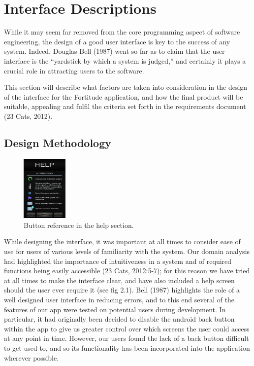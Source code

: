 \section{Interface Descriptions}
While it may seem far removed from the core programming aspect of software engineering, the design of a good user interface is key to the success of any system. Indeed, Douglas Bell (1987) went so far as to claim that the user interface is the “yardstick by which a system is judged,” and certainly it plays a crucial role in attracting users to the software.

This section will describe what factors are taken into consideration in the design of the interface for the Fortitude application, and how the final product will be suitable, appealing and fulfil the criteria set forth in the requirements document (23 Cats, 2012).

\subsection{Design Methodology}

\begin{figure}
	\vspace{-20pt}
	\begin{center}
	\includegraphics[width=0.2\textwidth]{images/help_mockup}
	\caption{Button reference in the help section.}
	\end{center}
	\vspace{-10pt}
\end{figure}

While designing the interface, it was important at all times to consider ease of use for users of various levels of familiarity with the system. Our domain analysis had highlighted the importance of intuitiveness in a system and of required functions being easily accessible (23 Cats, 2012:5-7); for this reason we have tried at all times to make the interface clear, and have also included a help screen should the user ever require it (see fig 2.1). Bell (1987) highlights the role of a well designed user interface in reducing errors, and to this end several of the features of our app were tested on potential users during development. In particular, it had originally been decided to disable the android back button within the app to give us greater control over which screens the user could access at any point in time. However, our users found the lack of a back button difficult to get used to, and so its functionality has been incorporated into the application wherever possible.

